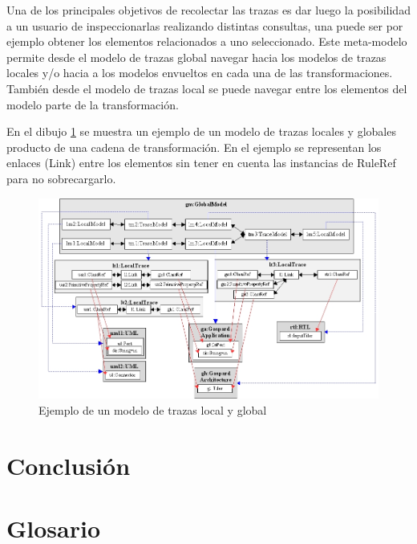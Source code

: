 \documentclass[a4paper,12pt,oneside]{book}
\begin{document}
Una de los principales objetivos de recolectar las trazas es dar luego la posibilidad a un usuario de inspeccionarlas realizando distintas consultas, una puede ser por ejemplo obtener los elementos relacionados a uno seleccionado. Este meta-modelo permite desde el modelo de trazas global navegar hacia los modelos de trazas locales y/o hacia a los modelos envueltos en cada una de las transformaciones. También desde el modelo de trazas local se puede navegar entre los elementos del modelo parte de la transformación.

En el dibujo \ref{fig:EjemploLocalGlobalMetamodel} se muestra un ejemplo de un modelo de trazas locales y globales producto de una cadena de transformación. En el ejemplo se representan los enlaces (Link) entre los elementos sin tener en cuenta las instancias de RuleRef para no sobrecargarlo.

\begin{figure}[hbtp]
\centering
\includegraphics[scale=.45]{./img/EjemploLocalGlobalMetamodel}
\caption{Ejemplo de un modelo de trazas local y global}
\label{fig:EjemploLocalGlobalMetamodel}
\end{figure}


\backmatter

\chapter{Conclusión}


\chapter{Glosario}
\end{document}
